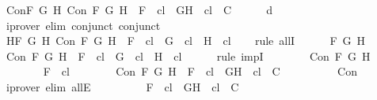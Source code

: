 \begin{isabellebody}
\ Con{\isacharcolon}{\isachardoublequoteopen}{\isasymforall}F\ G\ H{\isachardot}\ Con\ F\ G\ H\ {\isasymlongrightarrow}\ F\ {\isasymin}\ {\isacharquery}cl\ {\isasymlongrightarrow}\ {\isacharbraceleft}G{\isacharcomma}H{\isacharbraceright}\ {\isasymunion}\ {\isacharquery}cl\ {\isasymin}\ C{\isachardoublequoteclose}\isanewline
\ \ \ \ \isamarkupfalse%
\ d\ \isamarkupfalse%
\ {\isacharparenleft}iprover\ elim{\isacharcolon}\ conjunct{}\ conjunct{}{\isacharparenright}\isanewline
\ \ \isamarkupfalse%
\ H{}{\isacharcolon}{\isachardoublequoteopen}{\isasymforall}F\ G\ H{\isachardot}\ Con\ F\ G\ H\ {\isasymlongrightarrow}\ F\ {\isasymin}\ {\isacharquery}cl\ {\isasymlongrightarrow}\ G\ {\isasymin}\ {\isacharquery}cl\ {\isasymand}\ H\ {\isasymin}\ {\isacharquery}cl{\isachardoublequoteclose}\isanewline
\ \ \isamarkupfalse%
\ {\isacharparenleft}rule\ allI{\isacharparenright}{\isacharplus}\isanewline
\ \ \ \ \isamarkupfalse%
\ F\ G\ H\isanewline
\ \ \ \ \isamarkupfalse%
\ {\isachardoublequoteopen}Con\ F\ G\ H\ {\isasymlongrightarrow}\ F\ {\isasymin}\ {\isacharquery}cl\ {\isasymlongrightarrow}\ G\ {\isasymin}\ {\isacharquery}cl\ {\isasymand}\ H\ {\isasymin}\ {\isacharquery}cl{\isachardoublequoteclose}\isanewline
\ \ \ \ \isamarkupfalse%
\ {\isacharparenleft}rule\ impI{\isacharparenright}{\isacharplus}\isanewline
\ \ \ \ \ \ \isamarkupfalse%
\ {\isachardoublequoteopen}Con\ F\ G\ H{\isachardoublequoteclose}\isanewline
\ \ \ \ \ \ \isamarkupfalse%
\ {\isachardoublequoteopen}F\ {\isasymin}\ {\isacharquery}cl{\isachardoublequoteclose}\isanewline
\ \ \ \ \ \ \isamarkupfalse%
\ {\isachardoublequoteopen}Con\ F\ G\ H\ {\isasymlongrightarrow}\ F\ {\isasymin}\ {\isacharquery}cl\ {\isasymlongrightarrow}\ {\isacharbraceleft}G{\isacharcomma}H{\isacharbraceright}\ {\isasymunion}\ {\isacharquery}cl\ {\isasymin}\ C{\isachardoublequoteclose}\isanewline
\ \ \ \ \ \ \ \ \isamarkupfalse%
\ Con\ \isamarkupfalse%
\ {\isacharparenleft}iprover\ elim{\isacharcolon}\ allE{\isacharparenright}\isanewline
\ \ \ \ \ \ \isamarkupfalse%
\ \isamarkupfalse%
\ {\isachardoublequoteopen}F\ {\isasymin}\ {\isacharquery}cl\ {\isasymlongrightarrow}\ {\isacharbraceleft}G{\isacharcomma}H{\isacharbraceright}\ {\isasymunion}\ {\isacharquery}cl\ {\isasymin}\ C{\isachardoublequoteclose}\isanewline
\ \ \ \ \ \ \ \ \isamarkupfalse%

\end{isabellebody}
